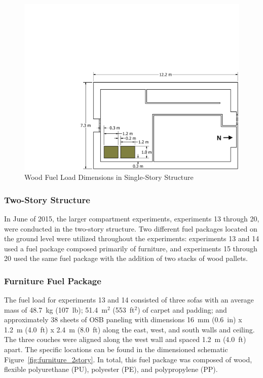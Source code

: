 \documentclass[12pt,oneside]{book}
\begin{document}
\begin{figure}[!ht]
	\includegraphics[width=\columnwidth]{../Figures/Floor_Plans/PDFs/East_Structure/DelCo_2012_East_Structure_Pallets}
	\caption{Wood Fuel Load Dimensions in Single-Story Structure}
	\label{fig:Wood_Fuel_Load_Dimensions}
\end{figure}


\subsubsection*{Two-Story Structure}
\label{sec:suppresion_two}

In June of 2015, the larger compartment experiments, experiments 13 through 20, were conducted in the two-story structure.  Two different fuel packages located on the ground level were utilized throughout the experiments: experiments 13 and 14 used a fuel package composed primarily of furniture, and experiments 15 through 20 used the same fuel package with the addition of two stacks of wood pallets.   

\subsubsection{Furniture Fuel Package}
\label{sec:fire_suppression_furniture_fuel_2}

The fuel load for experiments 13 and 14 consisted of three sofas with an average mass of 48.7~kg (107~lb); 51.4~m$^2$ (553~ft$^2$) of carpet and padding; and approximately 38 sheets of OSB paneling with dimensions 16~mm (0.6~in) x 1.2~m (4.0~ft) x 2.4~m (8.0~ft) along the east, west, and south walls and ceiling. The three couches were aligned along the west wall and spaced 1.2~m (4.0~ft) apart. The specific locations can be found in the dimensioned schematic Figure~\ref{fig:furniture_2story}. In total, this fuel package was composed of wood, flexible polyurethane (PU), polyester (PE), and polypropylene (PP).
\end{document}
